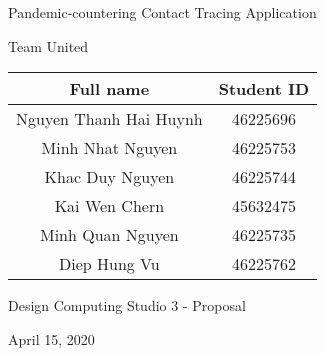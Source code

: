 \newpage

\clearpage
\setcounter{page}{1}

\begin{center}
  \par {\huge Pandemic-countering Contact Tracing Application}
  \vspace{0.25cm}
  \par {\LARGE Team United}
  \begin{center}
    \begin{tabular}{ |c|c| }
      \hline
      Full name & Student ID \\
      \hline
      Nguyen Thanh Hai Huynh & 46225696 \\
      Minh Nhat Nguyen       & 46225753 \\
      Khac Duy Nguyen        & 46225744 \\
      Kai Wen Chern          & 45632475 \\
      Minh Quan Nguyen       & 46225735 \\
      Diep Hung Vu           & 46225762 \\
      \hline
    \end{tabular}
  \end{center}
  \par {\LARGE Design Computing Studio 3 - Proposal}
  \vspace{0.25cm}
  \par {\Large April 15, 2020}
\end{center}

